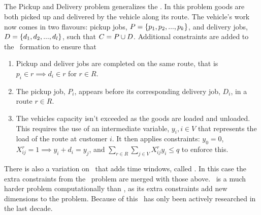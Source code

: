 \subsection{\PDP}

The Pickup and Delivery problem generalizes the \VRP. In this problem goods are both picked up and delivered by the vehicle along its route. The vehicle's work now comes in two flavours: pickup jobs, $P = \{p_1,p_2,...,p_k\}$, and delivery jobs, $D = \{d_1,d_2,...,d_l\}$, such that $C = P \cup D$. Additional constraints are added to the \CVRP\ formation to ensure that

\begin{enumerate}
   \item Pickup and deliver jobs are completed on the same route, that is $p_i \in r \implies d_i \in r$ for $r \in R$.

   \item The pickup job, $P_i$, appears before its corresponding delivery job, $D_i$, in a route $r \in R$.

   \item The vehicles capacity isn't exceeded as the goods are loaded and unloaded. This requires the use of an intermediate variable, $y_i, i \in V$ that represents the load of the route at customer $i$. It then applies constraints: $y_0 = 0$, $X_{ij}^r = 1 \implies y_i + d_i = y_j$, and $\sum_{r \in R} \sum_{j \in V} X_{ij}^r y_i \leq q$ to enforce this.
   
\end{enumerate}

There is also a variation on \PDP\ that adds time windows, called \PDPTW. In this case the extra constraints from the \VRPTW\ problem are merged with those above. \PDP\ is a much harder problem computationally than \VRP, as its extra constraints add new dimensions to the problem. Because of this \PDP\ has only been actively researched in the last decade. 


